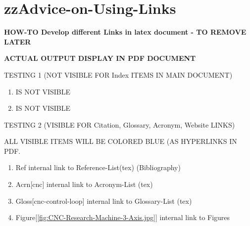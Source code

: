 \pagebreak


\section{zzAdvice-on-Using-Links}

\textbf{HOW-TO Develop different Links in latex document - TO REMOVE LATER}	
\vspace*{1\baselineskip}
	
\textbf{ACTUAL OUTPUT DISPLAY IN PDF DOCUMENT}
\vspace*{1\baselineskip}	

\begin{tcolorbox}	
TESTING 1 (NOT VISIBLE FOR Index ITEMS IN MAIN DOCUMENT)
\vspace*{1\baselineskip}

\begin{enumerate}
	
	\item {}  				 IS NOT VISIBLE
	\item {}  IS NOT VISIBLE
	
\end{enumerate}
\vspace*{1\baselineskip}

TESTING 2 (VISIBLE FOR Citation, Glossary, Acronym, Website LINKS)
\vspace*{1\baselineskip}

ALL VISIBLE ITEMS WILL BE COLORED BLUE (AS HYPERLINKS IN PDF.
\vspace*{1\baselineskip}

\begin{enumerate}
	
	\item Ref\cite{FYP_Abzal_2012} internal link to Reference-List(tex) (Bibliography)
	
	\item Acrn[\gls{cnc}] internal link to Acronym-List (tex)
	
	\item Gloss[\gls{cnc-control-loop}] internal link to Glossary-List (tex)
	
	\item Figure[\ref{fig:CNC-Research-Machine-3-Axis.jpg}] internal link to Figures 
	

\end{enumerate}
\end{tcolorbox}
